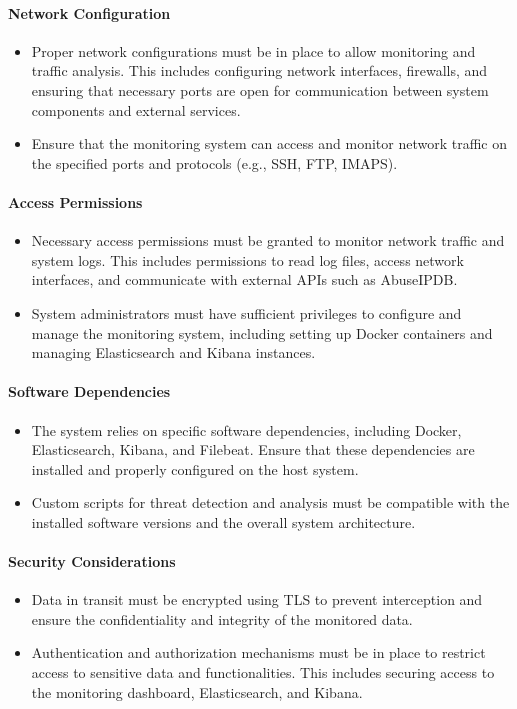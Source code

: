 \documentclass{article}
\begin{document}
    \paragraph{Network Configuration}
    \begin{itemize}
        \item Proper network configurations must be in place to allow monitoring and traffic analysis.
        This includes configuring network interfaces, firewalls, and ensuring that necessary ports are open for communication between system components and external services.
        \item Ensure that the monitoring system can access and monitor network traffic on the specified ports and protocols (e.g., SSH, FTP, IMAPS).
    \end{itemize}

    \paragraph{Access Permissions}
    \begin{itemize}
        \item Necessary access permissions must be granted to monitor network traffic and system logs.
        This includes permissions to read log files, access network interfaces, and communicate with external APIs such as AbuseIPDB\@.
        \item System administrators must have sufficient privileges to configure and manage the monitoring system, including setting up Docker containers and managing Elasticsearch and Kibana instances.
    \end{itemize}

    \paragraph{Software Dependencies}
    \begin{itemize}
        \item The system relies on specific software dependencies, including Docker, Elasticsearch, Kibana, and Filebeat.
        Ensure that these dependencies are installed and properly configured on the host system.
        \item Custom scripts for threat detection and analysis must be compatible with the installed software versions and the overall system architecture.
    \end{itemize}

    \paragraph{Security Considerations}
    \begin{itemize}
        \item Data in transit must be encrypted using TLS to prevent interception and ensure the confidentiality and integrity of the monitored data.
        \item Authentication and authorization mechanisms must be in place to restrict access to sensitive data and functionalities.
        This includes securing access to the monitoring dashboard, Elasticsearch, and Kibana.
    \end{itemize}
\end{document}
